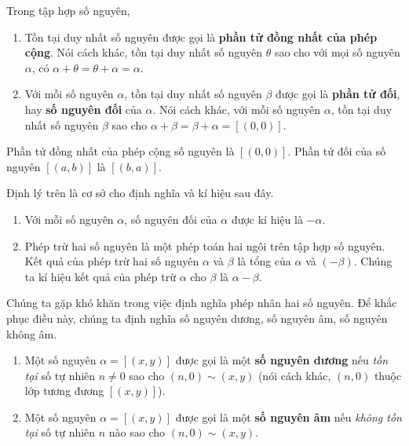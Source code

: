 \begin{theorem}\label{theorem:uniqueness-of-additive-identity-and-additive-inverse}
    Trong tập hợp số nguyên,
    \begin{enumerate}[label={(\roman*)}]
        \item Tồn tại duy nhất số nguyên được gọi là \textbf{phần tử đồng nhất của phép cộng}. Nói cách khác, tồn tại duy nhất số nguyên $\theta$ sao cho với mọi số nguyên $\alpha$, có $\alpha + \theta = \theta + \alpha = \alpha$.
        \item Với mỗi số nguyên $\alpha$, tồn tại duy nhất số nguyên $\beta$ được gọi là \textbf{phần tử đối}, hay \textbf{số nguyên đối} của $\alpha$. Nói cách khác, với mỗi số nguyên $\alpha$, tồn tại duy nhất số nguyên $\beta$ sao cho $\alpha + \beta = \beta + \alpha = [(0,0)]$.
    \end{enumerate}
\end{theorem}

Phần tử đồng nhất của phép cộng số nguyên là $[(0,0)]$. Phần tử đối của số nguyên $[(a, b)]$ là $[(b, a)]$.

Định lý trên là cơ sở cho định nghĩa và kí hiệu sau đây.
\begin{definition}
    \begin{enumerate}[label={(\roman*)}]
        \item Với mỗi số nguyên $\alpha$, số nguyên đối của $\alpha$ được kí hiệu là $-\alpha$.
        \item Phép trừ hai số nguyên là một phép toán hai ngôi trên tập hợp số nguyên. Kết quả của phép trừ hai số nguyên $\alpha$ và $\beta$ là tổng của $\alpha$ và $(-\beta)$. Chúng ta kí hiệu kết quả của phép trừ $\alpha$ cho $\beta$ là $\alpha - \beta$.
    \end{enumerate}
\end{definition}

Chúng ta gặp khó khăn trong việc định nghĩa phép nhân hai số nguyên. Để khắc phục điều này, chúng ta định nghĩa số nguyên dương, số nguyên âm, số nguyên không âm.
\begin{definition}
    \begin{enumerate}[label={(\roman*)}]
        \item Một số nguyên $\alpha = [(x, y)]$ được gọi là một \textbf{số nguyên dương} nếu \textit{tồn tại} số tự nhiên $n\ne 0$ sao cho $(n, 0)\sim (x, y)$ (nói cách khác, $(n, 0)$ thuộc lớp tương đương $[(x, y)]$).
        \item Một số nguyên $\alpha = [(x, y)]$ được gọi là một \textbf{số nguyên âm} nếu \textit{không tồn tại} số tự nhiên $n$ nào sao cho $(n, 0)\sim (x, y)$.
    \end{enumerate}
\end{definition}

